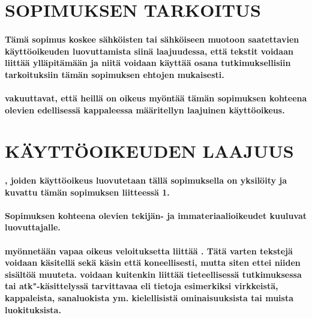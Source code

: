 \documentclass[a4paper,finnish]{article}
\begin{document}
\section{SOPIMUKSEN TARKOITUS}

\paragraph{Tämä sopimus koskee sähköisten tai sähköiseen muotoon saatettavien
 käyttöoikeuden luovuttamista siinä laajuudessa, että tekstit
voidaan liittää  ylläpitämään
 ja niitä voidaan käyttää  osana
tutkimuksellisiin tarkoituksiin tämän sopimuksen ehtojen mukaisesti.}

\paragraph{ vakuuttavat, että heillä on
oikeus myöntää  tämän sopimuksen
kohteena olevien  edellisessä kappaleessa määritellyn
laajuinen käyttöoikeus.}

\section{KÄYTTÖOIKEUDEN LAAJUUS}

\paragraph{, joiden käyttöoikeus luovutetaan tällä sopimuksella 
on yksilöity ja kuvattu tämän sopimuksen liitteessä 1.}

\paragraph{Sopimuksen kohteena olevien  tekijän- ja
immateriaalioikeudet kuuluvat luovuttajalle.}

\paragraph{ myönnetään vapaa oikeus
veloituksetta liittää  . Tätä
varten tekstejä voidaan käsitellä sekä käsin että koneellisesti, mutta
siten ettei niiden sisältöä muuteta.  voidaan
kuitenkin liittää tieteellisessä tutkimuksessa tai atk"-käsittelyssä
tarvittavaa  eli tietoja esimerkiksi virkkeistä,
kappaleista, sanaluokista ym. kielellisistä ominaisuuksista tai muista
luokituksista.}
\end{document}
